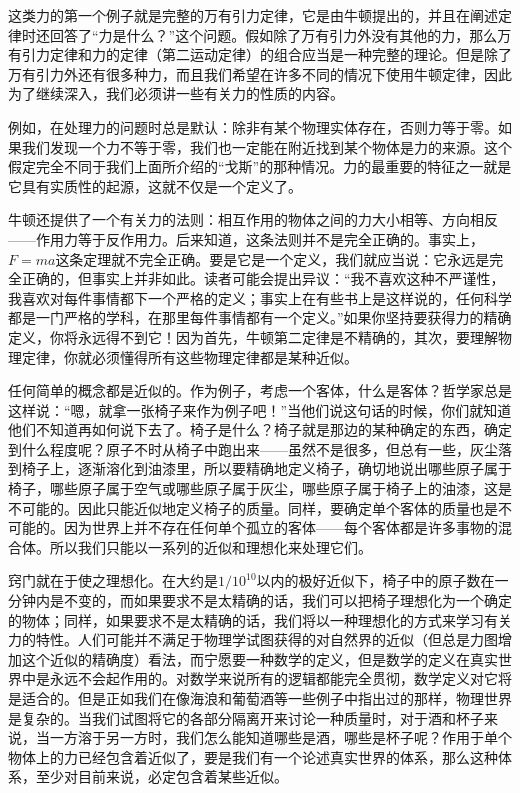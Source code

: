 这类力的第一个例子就是完整的万有引力定律，它是由牛顿提出的，并且在阐述定律时还回答了“力是什么？”这个问题。假如除了万有引力外没有其他的力，那么万有引力定律和力的定律（第二运动定律）的组合应当是一种完整的理论。但是除了万有引力外还有很多种力，而且我们希望在许多不同的情况下使用牛顿定律，因此为了继续深入，我们必须讲一些有关力的性质的内容。

例如，在处理力的问题时总是默认：除非有某个物理实体存在，否则力等于零。如果我们发现一个力不等于零，我们也一定能在附近找到某个物体是力的来源。这个假定完全不同于我们上面所介绍的“戈斯”的那种情况。力的最重要的特征之一就是它具有实质性的起源，这就不仅是一个定义了。

牛顿还提供了一个有关力的法则：相互作用的物体之间的力大小相等、方向相反——作用力等于反作用力。后来知道，这条法则并不是完全正确的。事实上，$F=ma$这条定理就不完全正确。要是它是一个定义，我们就应当说：它永远是完全正确的，但事实上并非如此。读者可能会提出异议：“我不喜欢这种不严谨性，我喜欢对每件事情都下一个严格的定义；事实上在有些书上是这样说的，任何科学都是一门严格的学科，在那里每件事情都有一个定义。”如果你坚持要获得力的精确定义，你将永远得不到它！因为首先，牛顿第二定律是不精确的，其次，要理解物理定律，你就必须懂得所有这些物理定律都是某种近似。

任何简单的概念都是近似的。作为例子，考虑一个客体，什么是客体？哲学家总是这样说：“嗯，就拿一张椅子来作为例子吧！”当他们说这句话的时候，你们就知道他们不知道再如何说下去了。椅子是什么？椅子就是那边的某种确定的东西，确定到什么程度呢？原子不时从椅子中跑出来——虽然不是很多，但总有一些，灰尘落到椅子上，逐渐溶化到油漆里，所以要精确地定义椅子，确切地说出哪些原子属于椅子，哪些原子属于空气或哪些原子属于灰尘，哪些原子属于椅子上的油漆，这是不可能的。因此只能近似地定义椅子的质量。同样，要确定单个客体的质量也是不可能的。因为世界上并不存在任何单个孤立的客体——每个客体都是许多事物的混合体。所以我们只能以一系列的近似和理想化来处理它们。

窍门就在于使之理想化。在大约是$1/10^{10}$以内的极好近似下，椅子中的原子数在一分钟内是不变的，而如果要求不是太精确的话，我们可以把椅子理想化为一个确定的物体；同样，如果要求不是太精确的话，我们将以一种理想化的方式来学习有关力的特性。人们可能并不满足于物理学试图获得的对自然界的近似（但总是力图增加这个近似的精确度）看法，而宁愿要一种数学的定义，但是数学的定义在真实世界中是永远不会起作用的。对数学来说所有的逻辑都能完全贯彻，数学定义对它将是适合的。但是正如我们在像海浪和葡萄酒等一些例子中指出过的那样，物理世界是复杂的。当我们试图将它的各部分隔离开来讨论一种质量时，对于酒和杯子来说，当一方溶于另一方时，我们怎么能知道哪些是酒，哪些是杯子呢？作用于单个物体上的力已经包含着近似了，要是我们有一个论述真实世界的体系，那么这种体系，至少对目前来说，必定包含着某些近似。

